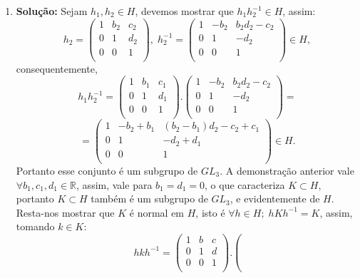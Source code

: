 \documentclass{article}
\begin{document}
\begin{enumerate}
		\item \textbf{Solução:} Sejam $h_{1}, h_{2} \in H$, devemos mostrar que $h_{1}h_{2}^{-1} \in H$, assim:
		$$
		h_{2} = \left(
		\begin{array}{ccc}
		1 & b_{2} & c_{2} \\
		0 & 1 & d_{2} \\
		0 & 0 & 1 \\
		\end{array}
		\right), \; 
		h_{2}^{-1} = \left(
		\begin{array}{ccc}
		1 & -b_{2} & b_{2}d_{2} - c_{2}\\
		0 & 1 & -d_{2} \\
		0 & 0 & 1 \\
		\end{array}
		\right) \in H,
		$$
		consequentemente,
		$$
		h_{1}h_{2}^{-1} = \left(
		\begin{array}{ccc}
		1 & b_{1} & c_{1} \\
		0 & 1 & d_{1} \\
		0 & 0 & 1 \\
		\end{array}
		\right).
		\left(
		\begin{array}{ccc}
		1 & -b_{2} & b_{2}d_{2} - c_{2}\\
		0 & 1 & -d_{2} \\
		0 & 0 & 1 \\
		\end{array}
		\right) = 
		$$
		$$
		= 		\left(
		\begin{array}{ccc}
		1 & -b_{2}+b_{1} & (b_{2}- b_{1})d_{2} - c_{2} +c_{1}\\
		0 & 1 & -d_{2} + d_{1}\\
		0 & 0 & 1 \\
		\end{array}
		\right) \in H.
		$$
		Portanto esse conjunto é um subgrupo de $GL_{3}$.
		A demonstração anterior vale $\forall b_{1}, c_{1}, d_{1} \in \mathbb{R}$, assim, vale para $b_{1}=d_{1}=0$, o que caracteriza $K \subset H$, portanto $K \subset H$ também é um subgrupo de $GL_{3}$, e evidentemente de $H$. Resta-nos mostrar que $K$ é normal em $H$, isto é $\forall h \in H; \; hKh^{-1} = K$, assim, tomando $k \in K$:
		$$
		hkh^{-1} = \left(
		\begin{array}{ccc}
		1 & b & c\\
		0 & 1 & d \\
		0 & 0 & 1 \\
		\end{array}
		\right).
		\left(
$$
\end{enumerate}
\end{document}
